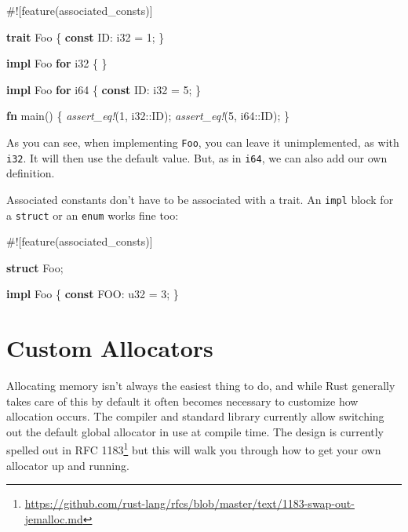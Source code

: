\documentclass[a4paper,]{book}
\newenvironment{Shaded}{\begin{snugshade}}{\end{snugshade}}
\newcommand{\KeywordTok}[1]{\textcolor[rgb]{0.13,0.29,0.53}{\textbf{{#1}}}}
\newcommand{\DataTypeTok}[1]{\textcolor[rgb]{0.13,0.29,0.53}{{#1}}}
\newcommand{\DecValTok}[1]{\textcolor[rgb]{0.00,0.00,0.81}{{#1}}}
\newcommand{\PreprocessorTok}[1]{\textcolor[rgb]{0.56,0.35,0.01}{\textit{{#1}}}}
\newcommand{\AttributeTok}[1]{\textcolor[rgb]{0.77,0.63,0.00}{{#1}}}
\newcommand{\NormalTok}[1]{{#1}}
\renewcommand{\href}[2]{#2\footnote{\url{#1}}}
\begin{document}
\begin{Shaded}
\begin{Highlighting}[]
\AttributeTok{#![}\NormalTok{feature}\AttributeTok{(}\NormalTok{associated_consts}\AttributeTok{)]}

\KeywordTok{trait} \NormalTok{Foo \{}
    \KeywordTok{const} \NormalTok{ID: }\DataTypeTok{i32} \NormalTok{= }\DecValTok{1}\NormalTok{;}
\NormalTok{\}}

\KeywordTok{impl} \NormalTok{Foo }\KeywordTok{for} \DataTypeTok{i32} \NormalTok{\{}
\NormalTok{\}}

\KeywordTok{impl} \NormalTok{Foo }\KeywordTok{for} \DataTypeTok{i64} \NormalTok{\{}
    \KeywordTok{const} \NormalTok{ID: }\DataTypeTok{i32} \NormalTok{= }\DecValTok{5}\NormalTok{;}
\NormalTok{\}}

\KeywordTok{fn} \NormalTok{main() \{}
    \PreprocessorTok{assert_eq!}\NormalTok{(}\DecValTok{1}\NormalTok{, }\DataTypeTok{i32}\NormalTok{::ID);}
    \PreprocessorTok{assert_eq!}\NormalTok{(}\DecValTok{5}\NormalTok{, }\DataTypeTok{i64}\NormalTok{::ID);}
\NormalTok{\}}
\end{Highlighting}
\end{Shaded}

As you can see, when implementing \texttt{Foo}, you can leave it
unimplemented, as with \texttt{i32}. It will then use the default value.
But, as in \texttt{i64}, we can also add our own definition.

Associated constants don't have to be associated with a trait. An
\texttt{impl} block for a \texttt{struct} or an \texttt{enum} works fine
too:

\begin{Shaded}
\begin{Highlighting}[]
\AttributeTok{#![}\NormalTok{feature}\AttributeTok{(}\NormalTok{associated_consts}\AttributeTok{)]}

\KeywordTok{struct} \NormalTok{Foo;}

\KeywordTok{impl} \NormalTok{Foo \{}
    \KeywordTok{const} \NormalTok{FOO: }\DataTypeTok{u32} \NormalTok{= }\DecValTok{3}\NormalTok{;}
\NormalTok{\}}
\end{Highlighting}
\end{Shaded}

\section{Custom Allocators}\label{sec--custom-allocators}

Allocating memory isn't always the easiest thing to do, and while Rust
generally takes care of this by default it often becomes necessary to
customize how allocation occurs. The compiler and standard library
currently allow switching out the default global allocator in use at
compile time. The design is currently spelled out in
\href{https://github.com/rust-lang/rfcs/blob/master/text/1183-swap-out-jemalloc.md}{RFC
1183} but this will walk you through how to get your own allocator up
and running.
\end{document}

